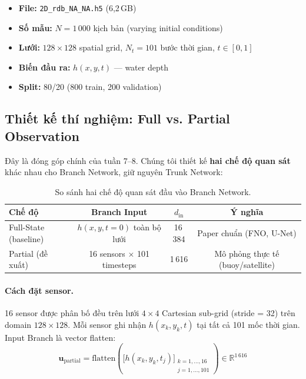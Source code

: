 \documentclass[12pt,a4paper]{article}
\begin{document}
\begin{itemize}[nosep]
  \item \textbf{File:} \texttt{2D\_rdb\_NA\_NA.h5} (6,2\,GB)
  \item \textbf{Số mẫu:} $N = 1\,000$ kịch bản (varying initial conditions)
  \item \textbf{Lưới:} $128 \times 128$ spatial grid, $N_t = 101$ bước thời gian, $t \in [0, 1]$
  \item \textbf{Biến đầu ra:} $h(x, y, t)$ --- water depth
  \item \textbf{Split:} 80/20 (800 train, 200 validation)
\end{itemize}

\subsection{Thiết kế thí nghiệm: Full vs. Partial Observation}

Đây là đóng góp chính của tuần 7--8. Chúng tôi thiết kế \textbf{hai chế độ quan sát} khác nhau cho Branch Network, giữ nguyên Trunk Network:

\begin{table}[ht]
  \centering
  \caption{So sánh hai chế độ quan sát đầu vào Branch Network.}
  \label{tab:observation}
  \begin{tabular}{@{}lccc@{}}
    \toprule
    \textbf{Chế độ} & \textbf{Branch Input} & $d_{\text{in}}$ & \textbf{Ý nghĩa} \\
    \midrule
    Full-State (baseline) & $h(x,y,t{=}0)$ toàn bộ lưới & 16\,384 & Paper chuẩn (FNO, U-Net) \\
    Partial (đề xuất) & 16 sensors $\times$ 101 timesteps & 1\,616 & Mô phỏng thực tế (buoy/satellite) \\
    \bottomrule
  \end{tabular}
\end{table}

\paragraph{Cách đặt sensor.} 16 sensor được phân bố đều trên lưới $4 \times 4$ Cartesian sub-grid (stride = 32) trên domain $128 \times 128$. Mỗi sensor ghi nhận $h(x_k, y_k, t)$ tại tất cả 101 mốc thời gian. Input Branch là vector flatten:
\begin{equation}
  \mathbf{u}_{\text{partial}} = \text{flatten}\!\left(\bigl[h(x_k, y_k, t_j)\bigr]_{\substack{k=1,\ldots,16 \\ j=1,\ldots,101}}\right) \in \mathbb{R}^{1\,616}
\end{equation}
\end{document}
